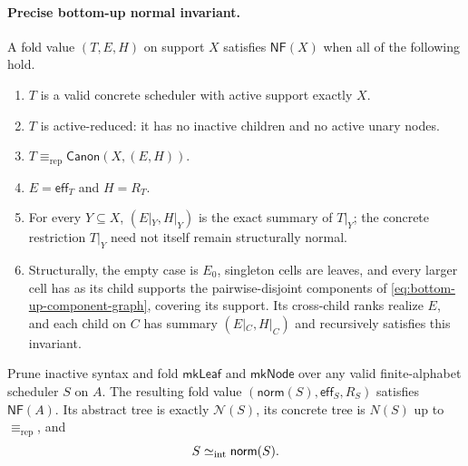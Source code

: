 \paragraph{Precise bottom-up normal invariant.}
A fold value \((T,E,H)\) on support \(X\) satisfies \(\mathsf{NF}(X)\) when all
of the following hold.
\begin{enumerate}
\item \(T\) is a valid concrete scheduler with active support exactly \(X\).
\item \(T\) is active-reduced: it has no inactive children and no active unary
      nodes.
\item \(T\equiv_{\mathrm{rep}}\mathsf{Canon}(X,(E,H))\).
\item \(E=\mathsf{eff}_T\) and \(H=R_T\).
\item For every \(Y\subseteq X\), \((E|_Y,H|_Y)\) is the exact summary of
      \(T|_Y\); the concrete restriction \(T|_Y\) need not itself remain
      structurally normal.
\item Structurally, the empty case is \(E_0\), singleton cells are leaves,
      and every larger cell has as its child supports the pairwise-disjoint
      components of \autoref{eq:bottom-up-component-graph}, covering its support.
      Its cross-child ranks realize \(E\), and each child on \(C\) has summary
      \((E|_C,H|_C)\) and recursively satisfies this invariant.
\end{enumerate}

\begin{theorem}
\label{thm:bottom-up-normalization}
Prune inactive syntax and fold \(\mathsf{mkLeaf}\) and \(\mathsf{mkNode}\)
over any valid finite-alphabet scheduler \(S\) on \(A\).  The resulting fold
value \((\mathsf{norm}(S),\mathsf{eff}_S,R_S)\) satisfies
\(\mathsf{NF}(A)\).  Its abstract tree is exactly \(\mathcal N(S)\), its
concrete tree is \(N(S)\) up to \(\equiv_{\mathrm{rep}}\), and
\[
 S\mathrel{\simeq_{\mathrm{int}}}\mathsf{norm}(S).
\]
\end{theorem}


